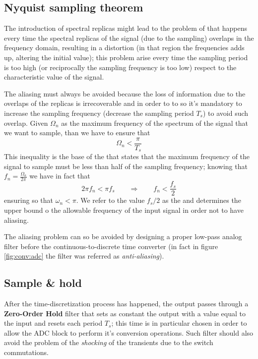 		\subsection{Nyquist sampling theorem} \label{sec:conv:nyquist}
			
			The introduction of spectral replicas might lead to the problem of  that happens every time the spectral replicas of the signal (due to the sampling) overlaps in the frequency domain, resulting in a distortion (in that region the frequencies adds up, altering the initial value); this problem arise every time the sampling period is too high (or reciprocally the sampling frequency is too low) respect to the characteristic value of the signal.
			
			The aliasing must always be avoided because the loss of information due to the overlaps of the replicas is irrecoverable and in order to to so it's mandatory to increase the sampling frequency (decrease the sampling period $T_s$) to avoid such overlap. Given $\Omega_n$ as the maximum frequency of the spectrum of the signal that we want to sample, than we have to ensure that
			\begin{equation}
				\Omega_n < \frac \pi {T_s}
			\end{equation}
			This inequality is the base of the  that states that the maximum frequency of the signal to sample must be less than half of the sampling frequency; knowing that $f_n = \frac{\Omega_n}{2\pi}$ we have in fact that
			\begin{equation} \label{eq:conv:nyquist}
				2\pi f_n < \pi f_s \qquad \Rightarrow \qquad f_n < \frac{f_s}{2}
			\end{equation}
			ensuring so that $\omega_n < \pi$. We refer to the value $f_s/2$ as the  and determines the upper bound o the allowable frequency of the input signal in order not to have aliasing. 
			
			The aliasing problem can so be avoided by designing a proper low-pass analog filter before the continuous-to-discrete time converter (in fact in figure \ref{fig:conv:adc} the filter was referred as \textit{anti-aliasing}).		
			
		\subsection{Sample \& hold}
			
			After the time-discretization process has happened, the output passes through a \textbf{Zero-Order Hold} filter that sets as constant the output with a value equal to the input and resets each period $T_s$; this time is in particular chosen in order to allow the ADC block to perform it's conversion operations. Such filter should also avoid the problem of the \textit{shocking} of the transients due to the switch commutations.
			
